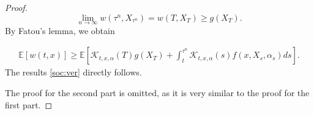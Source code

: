 \documentclass{article}
\begin{document}
\begin{proof}
\begin{equation*}
\lim_{n\rightarrow\infty}w(\tau^n,X_{\tau^n})=w(T,X_T)\geq g(X_T).
\end{equation*}
By Fatou's lemma, we obtain

\begin{equation*}
\begin{aligned}
\mathbb{E}[w(t,x)]\geq\mathbb{E}\left[\mathcal{K}_{t,x,\alpha}(T)g(X_T)+\int^{\tau^n}_t\mathcal{K}_{t,x,\alpha}(s)f(x,X_s,\alpha_s)ds\right].
\end{aligned}
\end{equation*}
The results \eqref{soc:ver} directly follows. 

The proof for the second part is omitted, as it is very similar to the proof for the first part. 

\end{proof}
\end{document}
